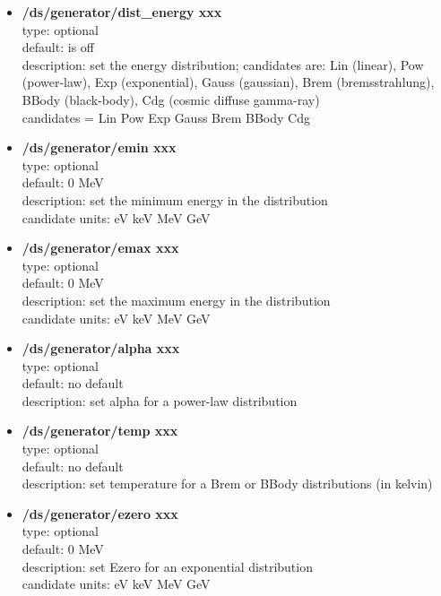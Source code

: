 \documentclass[twocolumn, 10pt]{article}
\begin{document}
\begin{itemize}
\item \textbf{/ds/generator/dist\_energy xxx}\\
type: optional \\
default: is off\\
description: set the energy distribution; candidates are: Lin (linear), Pow (power-law), Exp 
(exponential), Gauss (gaussian), Brem (bremsstrahlung), BBody (black-body), Cdg
(cosmic diffuse gamma-ray)\\
candidates = Lin Pow Exp Gauss Brem BBody Cdg\\  

\item \textbf{/ds/generator/emin xxx}\\
type: optional \\
default: 0 MeV\\
description: set the minimum energy in the distribution\\
candidate units: eV keV MeV GeV\\

\item \textbf{/ds/generator/emax xxx}\\
type: optional \\
default: 0 MeV\\
description: set the maximum energy in the distribution\\
candidate units: eV keV MeV GeV\\

\item \textbf{/ds/generator/alpha xxx}\\
type: optional \\
default: no default\\
description:  set alpha for a power-law distribution\\

\item \textbf{/ds/generator/temp xxx}\\
type: optional \\
default: no default\\
description:  set temperature for a Brem or BBody distributions (in kelvin)\\

\item \textbf{/ds/generator/ezero xxx}\\
type: optional \\
default: 0 MeV\\
description: set Ezero for an exponential distribution\\
candidate units: eV keV MeV GeV\\


\end{itemize}
\end{document}
